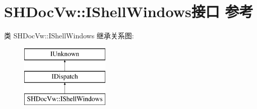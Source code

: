 \hypertarget{interface_s_h_doc_vw_1_1_i_shell_windows}{}\section{S\+H\+Doc\+Vw\+:\+:I\+Shell\+Windows接口 参考}
\label{interface_s_h_doc_vw_1_1_i_shell_windows}
类 S\+H\+Doc\+Vw\+:\+:I\+Shell\+Windows 继承关系图\+:\begin{figure}[H]
\begin{center}
\leavevmode
\includegraphics[height=3.000000cm]{interface_s_h_doc_vw_1_1_i_shell_windows}
\end{center}
\end{figure}
